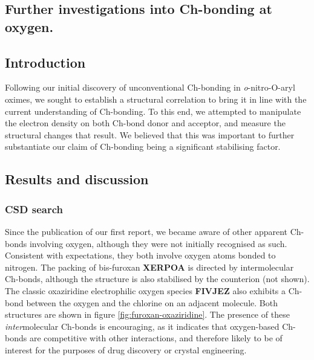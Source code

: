 \begin{refsection}
    \chapter{Further investigations into Ch-bonding at oxygen.}
    \label{app:o-ch-bonding}
    
    \section{Introduction}
    Following our initial discovery of unconventional Ch-bonding in \emph{o}-nitro-O-aryl oximes, we sought to establish a structural correlation to bring it in line with the current understanding of Ch-bonding.
    To this end, we attempted to manipulate the electron density on both Ch-bond donor and acceptor, and measure the structural changes that result.
    We believed that this was important to further substantiate our claim of Ch-bonding being a significant stabilising factor.
    
    \section{Results and discussion}
    
    \subsection{CSD search}
    Since the publication of our first report, we became aware of other apparent Ch-bonds involving oxygen, although they were not initially recognised as such.
    Consistent with expectations, they both involve oxygen atoms bonded to nitrogen.
    The packing of bis-furoxan \textbf{XERPOA} is directed by intermolecular  Ch-bonds, although the structure is also stabilised by the  counterion (not shown).\autocite{Gilardi2005}
    The classic oxaziridine electrophilic oxygen species \textbf{FIVJEZ} also exhibits a Ch-bond between the oxygen and the chlorine on an adjacent molecule.\autocite{Malpezzi1987}
    Both structures are shown in figure \cref{fig:furoxan-oxaziridine}.
    The presence of these \emph{inter}molecular Ch-bonds is encouraging, as it indicates that oxygen-based Ch-bonds are competitive with other interactions, and therefore likely to be of interest for the purposes of drug discovery or crystal engineering.\autocite{Taylor2020}
    

\end{refsection}

